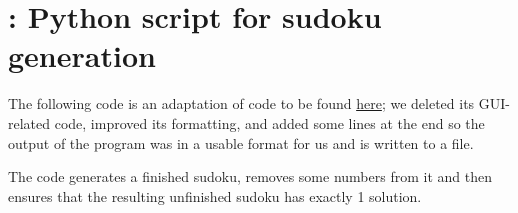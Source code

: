 \section{\appendixname: Python script for sudoku generation}
\label{app:sudoku}

The following code is an adaptation of code to be found \href{https://www.101computing.net/sudoku-generator-algorithm/}{here}; we deleted its GUI-related code, improved its formatting, and added some lines at the end so the output of the program was in a usable format for us and is written to a file.

The code generates a finished sudoku, removes some numbers from it and then ensures that the resulting unfinished sudoku has exactly 1 solution.


